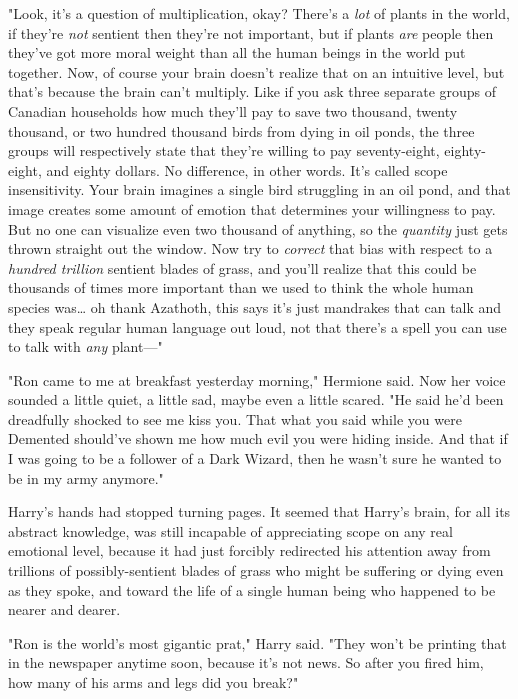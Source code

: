 "Look, it's a question of multiplication, okay? There's a \emph{lot} of plants 
in the world, if they're \emph{not} sentient then they're not important, but if 
plants \emph{are} people then they've got more moral weight than all the human 
beings in the world put together. Now, of course your brain doesn't realize 
that on an intuitive level, but that's because the brain can't multiply. Like 
if you ask three separate groups of Canadian households how much they'll pay to 
save two thousand, twenty thousand, or two hundred thousand birds from dying in 
oil ponds, the three groups will respectively state that they're willing to pay 
seventy-eight, eighty-eight, and eighty dollars. No difference, in other words. 
It's called scope insensitivity. Your brain imagines a single bird struggling 
in an oil pond, and that image creates some amount of emotion that determines 
your willingness to pay. But no one can visualize even two thousand of 
anything, so the \emph{quantity} just gets thrown straight out the window. Now 
try to \emph{correct} that bias with respect to a \emph{hundred trillion} 
sentient blades of grass, and you'll realize that this could be thousands of 
times more important than we used to think the whole human species was{\ldots} 
oh thank Azathoth, this says it's just mandrakes that can talk and they speak 
regular human language out loud, not that there's a spell you can use to talk 
with \emph{any} plant---"

"Ron came to me at breakfast yesterday morning," Hermione said. Now her voice 
sounded a little quiet, a little sad, maybe even a little scared. "He said he'd 
been dreadfully shocked to see me kiss you. That what you said while you were 
Demented should've shown me how much evil you were hiding inside. And that if I 
was going to be a follower of a Dark Wizard, then he wasn't sure he wanted to 
be in my army anymore."

Harry's hands had stopped turning pages. It seemed that Harry's brain, for all 
its abstract knowledge, was still incapable of appreciating scope on any real 
emotional level, because it had just forcibly redirected his attention away 
from trillions of possibly-sentient blades of grass who might be suffering or 
dying even as they spoke, and toward the life of a single human being who 
happened to be nearer and dearer.

"Ron is the world's most gigantic prat," Harry said. "They won't be printing 
that in the newspaper anytime soon, because it's not news. So after you fired 
him, how many of his arms and legs did you break?"

